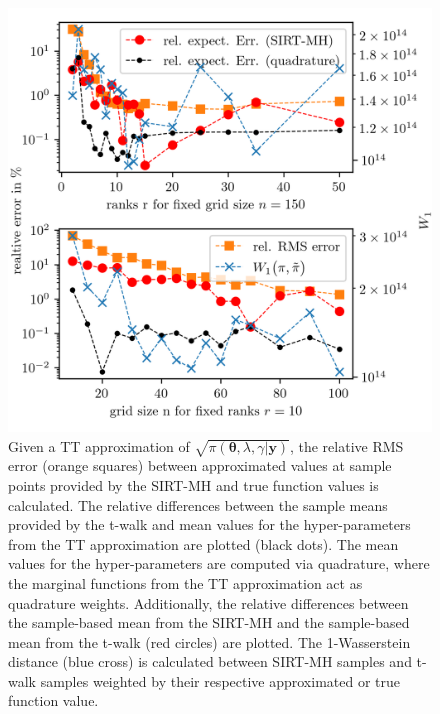 \begin{figure}[ht!]
	\centering
	\includegraphics[]{findGridRank.png}
	\caption[Optimal rank and number of grid points for TT approximation.]{Given a TT approximation of $\sqrt{\pi( \bm{\theta},\lambda,\gamma  | \bm{y}) }$, the relative RMS error (orange squares) between approximated values at sample points provided by the SIRT-MH and true function values is calculated. The relative differences between the sample means provided by the t-walk and mean values for the hyper-parameters from the TT approximation are plotted (black dots). The mean values for the hyper-parameters are computed via quadrature, where the marginal functions from the TT approximation act as quadrature weights. Additionally, the relative differences between the sample-based mean from the SIRT-MH and the sample-based mean from the t-walk (red circles) are plotted. The 1-Wasserstein distance (blue cross) is calculated between SIRT-MH samples and t-walk samples weighted by their respective approximated or true function value.}
	\label{fig:FindRankGrid}
\end{figure}
 

